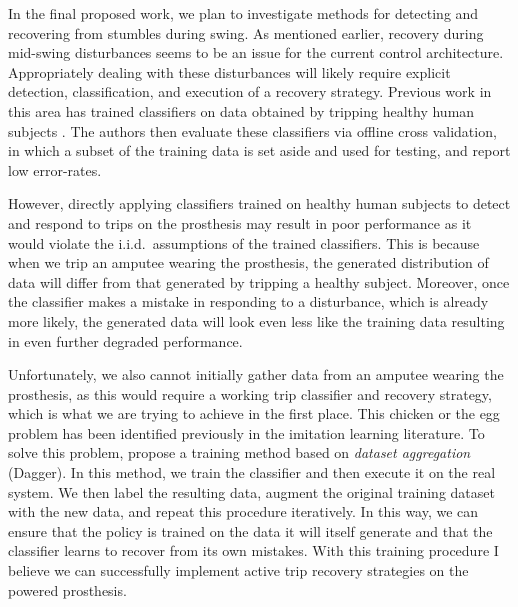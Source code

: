 In the final proposed work, we plan to investigate methods for detecting and
recovering from stumbles during swing. As mentioned earlier, recovery during
mid-swing disturbances seems to be an issue for the current control
architecture.  Appropriately dealing with these disturbances will likely require
explicit detection, classification, and execution of a recovery strategy.
Previous work in this area has trained classifiers on data obtained by tripping
healthy human subjects \citep{lawson2010stumble, shirota2014recovery}. The
authors then evaluate these classifiers via offline cross validation, in which a
subset of the training data is set aside and used for testing, and report low
error-rates. 

However, directly applying classifiers trained on healthy human subjects to
detect and respond to trips on the prosthesis may result in poor performance as
it would violate the i.i.d.\ assumptions of the trained classifiers.  This is
because when we trip an amputee wearing the prosthesis, the generated
distribution of data will differ from that generated by tripping a healthy
subject. Moreover, once the classifier makes a mistake in responding to a
disturbance, which is already more likely, the generated data will look even
less like the training data resulting in even further degraded performance. 

Unfortunately, we also cannot initially gather data from an amputee wearing the
prosthesis, as this would require a working trip classifier and recovery
strategy, which is what we are trying to achieve in the first place. This
chicken or the egg problem has been identified previously in the imitation
learning literature. To solve this problem, \citet{ross2011reduction} propose a
training method based on \emph{dataset aggregation} (Dagger). In this method, we
train the classifier and then execute it on the real system. We then label the
resulting data, augment the original training dataset with the new data, and
repeat this procedure iteratively. In this way, we can ensure that the policy is
trained on the data it will itself generate and that the classifier learns to
recover from its own mistakes. With this training procedure I believe we can
successfully implement active trip recovery strategies on the powered
prosthesis.

